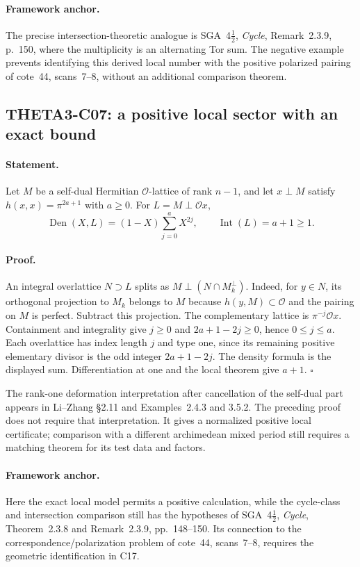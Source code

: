 \documentclass[11pt]{article}
\theoremstyle{definition}\newtheorem{definition}[theorem]{Definition}\newtheorem{remark}[theorem]{Remark}
\begin{document}
\paragraph{Framework anchor.}
The precise intersection-theoretic analogue is SGA~4$\frac12$,
\emph{Cycle}, Remark~2.3.9, p.~150, where the multiplicity is an
alternating Tor sum.  The negative example prevents identifying this
derived local number with the positive polarized pairing of cote~44,
scans~7--8, without an additional comparison theorem.

\subsection{THETA3-C07: a positive local sector with an exact bound}\label{C07}

\paragraph{Statement.}
Let $M$ be a self-dual Hermitian $\mathcal O$-lattice of rank $n-1$,
and let $x\perp M$ satisfy $h(x,x)=\pi^{2a+1}$ with $a\geq0$.
For $L=M\perp\mathcal O x$,
\[
 \operatorname{Den}(X,L)=(1-X)\sum_{j=0}^aX^{2j},
 \qquad \operatorname{Int}(L)=a+1\geq1.
\]

\paragraph{Proof.}
An integral overlattice $N\supset L$ splits as
$M\perp(N\cap M_k^\perp)$. Indeed, for $y\in N$, its orthogonal
projection to $M_k$ belongs to $M$ because $h(y,M)\subset\mathcal O$
and the pairing on $M$ is perfect. Subtract this projection.
The complementary lattice is $\pi^{-j}\mathcal O x$. Containment
and integrality give $j\geq0$ and $2a+1-2j\geq0$, hence
$0\leq j\leq a$. Each overlattice has index length $j$ and type
one, since its remaining positive elementary divisor is the odd
integer $2a+1-2j$. The density formula is the displayed sum.
Differentiation at one and the local theorem give $a+1$.
$\square$

The rank-one deformation interpretation after cancellation of the
self-dual part appears in Li--Zhang \S2.11 and Examples~2.4.3 and
3.5.2. The preceding proof does not require that interpretation.
It gives a normalized positive local certificate; comparison with
a different archimedean mixed period still requires a matching
theorem for its test data and factors.

\paragraph{Framework anchor.}
Here the exact local model permits a positive calculation, while the
cycle-class and intersection comparison still has the hypotheses of
SGA~4$\frac12$, \emph{Cycle}, Theorem~2.3.8 and Remark~2.3.9,
pp.~148--150.  Its connection to the correspondence/polarization problem
of cote~44, scans~7--8, requires the geometric identification in C17.
\end{document}
